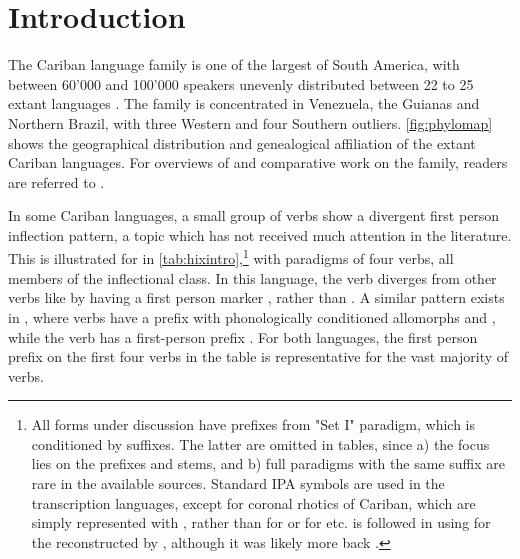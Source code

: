 \section{Introduction}
\label{sec:intro}
The Cariban language family is one of the largest of South America, with between 60'000 and 100'000 speakers unevenly distributed between 22 to 25 extant languages \parencite[441]{gildea2012classification}.
The family is concentrated in Venezuela, the Guianas and Northern Brazil, with three Western and four Southern outliers.
\cref{fig:phylomap} shows the geographical distribution and genealogical affiliation of the extant Cariban languages.
For overviews of and  comparative work on the family, readers are referred to \textcites{gildea1998}{derbyshire1999carib}{meira2002first}{meira2005southern}{meira2006cariban}{gildea2007greenberg}{meira2010origin}{gildea2010story}{gildea2012classification}{matter2021cariban}{gildea2019overview}.






In some Cariban languages, a small group of verbs show a divergent first person inflection pattern, a topic which has not received much attention in the literature.
This is illustrated for \hixka in \cref{tab:hixintro},\footnote{All forms under discussion have prefixes from  "Set I" paradigm, which is conditioned by  suffixes.
	The latter are omitted in tables, since a) the focus lies on the prefixes and stems, and b) full paradigms with the same  suffix are rare in the available sources.
Standard IPA symbols are used in the transcription languages, except for coronal rhotics of Cariban, which are simply represented with , rather than  for \wayana or  for \maqui etc.
\textcite{gildea2018reconstructing} is followed in using  for the \PC {} reconstructed by \textcite{meira2005southern}, although it was likely more back \parencite{gildea2010story}.}
with paradigms of four verbs, all members of the  inflectional class.
In this language, the verb  diverges from other  verbs like  by having a first person marker , rather than .
A similar pattern exists in \trio {}, where  verbs have a prefix with phonologically conditioned allomorphs  and , while the verb  has a first-person prefix .
For both languages, the first person prefix on the first four verbs in the table is representative for the vast majority of  verbs.

